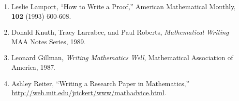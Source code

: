 \documentclass[12pt]{article}
\newenvironment{numlist}{
  \begin{enumerate}[(1)]
    \addtolength{\itemsep}{-1.0\itemsep}}
  {\end{enumerate}}
\newcounter{ex}\setcounter{ex}{0}
\newcounter{se}\setcounter{se}{0}
\begin{document}
\begin{numlist}

\item Leslie Lamport, ``How to Write a Proof,'' American Mathematical Monthly, \textbf{102} 
(1993) 600-608.  

\item Donald Knuth, Tracy Larrabee, and Paul Roberts,  \emph{Mathematical   Writing} MAA Notes Series, 1989.

\item Leonard Gillman, \emph{Writing Mathematics Well}, Mathematical
Association of America, 1987.

\item Ashley Reiter, ``Writing a Research Paper in Mathematics,''  \url{http://web.mit.edu/jrickert/www/mathadvice.html}.


\end{numlist}
\end{document}

